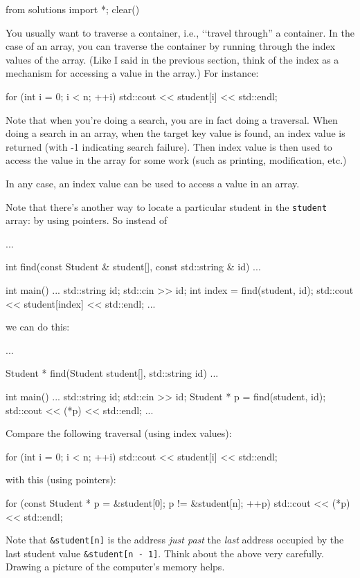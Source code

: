 \begin{python0}
from solutions import *; clear()
\end{python0}

You usually want to traverse a container, i.e.,
\lq\lq travel through'' a container.
In the case of an array, you can traverse the container
by running through the index values of the array.
(Like I said in the previous section, think of the index
as a mechanism for accessing a value in the array.)
For instance:
\begin{console}[frame=single,fontsize=\footnotesize]
for (int i = 0; i < n; ++i)
{
    std::cout << student[i] << std::endl;
}
\end{console}
Note that when you're doing a search, you are in fact doing
a traversal.
When doing a search in an array, when the target key value
is found, an index value is returned (with -1 indicating search failure).
Then index value is then used to access the value in the array
for some work (such as printing, modification, etc.)

In any case, an index value can be used to access a value in an array.

Note that there's another way to locate a particular student
in the \verb!student! array: by using pointers.
So instead of
\begin{console}[frame=single,fontsize=\footnotesize]
...

int find(const Student & student[], const std::string & id)
{
     ...
}

int main()
{
    ...
    std::string id;
    std::cin >> id;
    int index = find(student, id);
    std::cout << student[index] << std::endl;
    ...
}
\end{console}
we can do this:
\begin{console}[frame=single,fontsize=\footnotesize]
...

Student * find(Student student[], std::string id)
{
     ...
}

int main()
{
    ...    
    std::string id;
    std::cin >> id;
    Student * p = find(student, id);
    std::cout << (*p) << std::endl;
    ...
}
\end{console}


Compare the following traversal (using index values):
\begin{console}[frame=single,fontsize=\footnotesize]
for (int i = 0; i < n; ++i)
{
    std::cout << student[i] << std::endl;
}
\end{console}
with this (using pointers):
\begin{console}[frame=single,fontsize=\footnotesize]
for (const Student * p = &student[0]; p != &student[n]; ++p)
{
    std::cout << (*p) << std::endl;
}
\end{console}
Note that \verb!&student[n]! is the address
\textit{just past} the \textit{last} address occupied by the last student value
\verb!&student[n - 1]!.
Think about the above very carefully.
Drawing a picture of the computer's memory helps.

